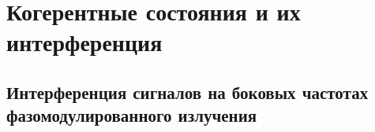 \chapter{Когерентные состояния и их интерференция}  \label{ch:ch4}
\section{Интерференция сигналов на боковых частотах фазомодулированного излучения } \label{sec:ch4/sec1}

